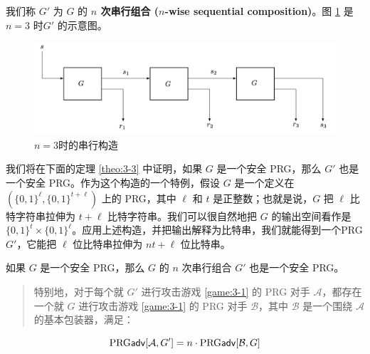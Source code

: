\vspace*{5pt}

\noindent
我们称 $G'$ 为 $G$ 的 \textbf{$n$ 次串行组合 ($n$-wise sequential composition)}。图 \ref{fig:3-6} 是 $n=3$ 时$G'$ 的示意图。

\begin{figure}
  \centering
  \includegraphics[width=0.8\linewidth]{figures/chapter3/fig6.png}
  \caption{$n=3$时的串行构造}
  \label{fig:3-6}
\end{figure}

我们将在下面的定理 \ref{theo:3-3} 中证明，如果 $G$ 是一个安全 PRG，那么 $G'$ 也是一个安全 PRG。作为这个构造的一个特例，假设 $G$ 是一个定义在 $(\{0,1\}^\ell,\{0,1\}^{t+\ell})$ 上的 PRG，其中 $\ell$ 和 $t$ 是正整数；也就是说，$G$ 把 $\ell$ 比特字符串拉伸为 $t+\ell$ 比特字符串。我们可以很自然地把 $G$ 的输出空间看作是 $\{0,1\}^t\times\{0,1\}^\ell$。应用上述构造，并把输出解释为比特串，我们就能得到一个PRG $G'$，它能把 $\ell$ 位比特串拉伸为 $nt+\ell$ 位比特串。

\begin{theorem}\label{theo:3-3}
如果 $G$ 是一个安全 PRG，那么 $G$ 的 $n$ 次串行组合 $G'$ 也是一个安全 PRG。
\begin{quote}
特别地，对于每个就 $G'$ 进行攻击游戏 \ref{game:3-1} 的 PRG 对手 $\mathcal A$，都存在一个就 $G$ 进行攻击游戏 \ref{game:3-1} 的 PRG 对手 $\mathcal B$，其中 $\mathcal B$ 是一个围绕 $\mathcal A$ 的基本包装器，满足：
\end{quote}
$$
{\rm PRG\mathsf{adv}}[\mathcal{A},G']=n\cdot{\rm PRG\mathsf{adv}}[\mathcal{B},G]
$$
\end{theorem}

